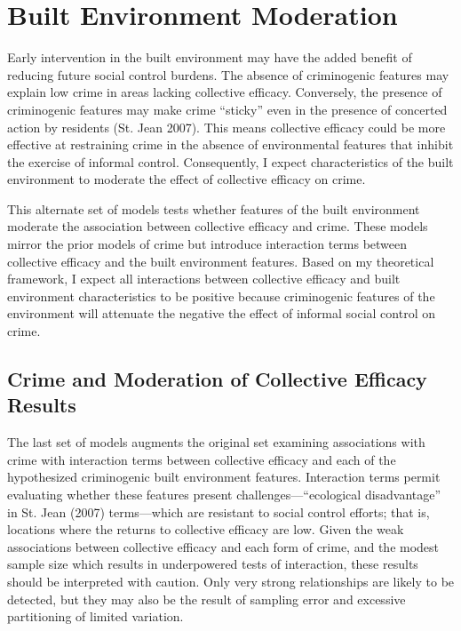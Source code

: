 \documentclass [11pt, proquest] {uwthesis}[2015/03/03]
\begin{document}
\hypertarget{bemoderation}{%
\chapter{Built Environment Moderation}\label{bemoderation}}

Early intervention in the built environment may have the added benefit of reducing future social control burdens. The absence of criminogenic features may explain low crime in areas lacking collective efficacy. Conversely, the presence of criminogenic features may make crime ``sticky'' even in the presence of concerted action by residents (St. Jean 2007). This means collective efficacy could be more effective at restraining crime in the absence of environmental features that inhibit the exercise of informal control. Consequently, I expect characteristics of the built environment to moderate the effect of collective efficacy on crime.

This alternate set of models tests whether features of the built environment moderate the association between collective efficacy and crime. These models mirror the prior models of crime but introduce interaction terms between collective efficacy and the built environment features. Based on my theoretical framework, I expect all interactions between collective efficacy and built environment characteristics to be positive because criminogenic features of the environment will attenuate the negative the effect of informal social control on crime.

\hypertarget{crime-and-moderation-of-collective-efficacy-results}{%
\section{Crime and Moderation of Collective Efficacy Results}\label{crime-and-moderation-of-collective-efficacy-results}}

The last set of models augments the original set examining associations with crime with interaction terms between collective efficacy and each of the hypothesized criminogenic built environment features. Interaction terms permit evaluating whether these features present challenges---``ecological disadvantage'' in St. Jean (2007) terms---which are resistant to social control efforts; that is, locations where the returns to collective efficacy are low. Given the weak associations between collective efficacy and each form of crime, and the modest sample size which results in underpowered tests of interaction, these results should be interpreted with caution. Only very strong relationships are likely to be detected, but they may also be the result of sampling error and excessive partitioning of limited variation.
\end{document}
